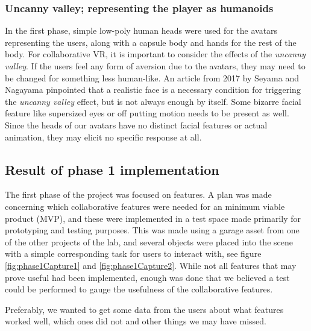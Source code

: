\subsubsection{Uncanny valley; representing the player as humanoids}
In the first phase, simple low-poly human heads were used for the avatars representing the users, along with a capsule body and hands for the rest of the body. For collaborative VR, it is important to consider the effects of the \textit{uncanny valley}\cite{mori2012uncanny}. If the users feel any form of aversion due to the avatars, they may need to be changed for something less human-like. An article from 2017 by Seyama and Nagayama \cite{seyama2007uncanny} pinpointed that a realistic face is a necessary condition for triggering the \textit{uncanny valley} effect, but is not always enough by itself. Some bizarre facial feature like supersized eyes or off putting motion needs to be present as well. Since the heads of our avatars have no distinct facial features or actual animation, they may elicit no specific response at all.

\subsection{Result of phase 1 implementation}
The first phase of the project was focused on features. A plan was made concerning which collaborative features were needed for an minimum viable product (MVP), and these were implemented in a test space made primarily for prototyping and testing purposes. This was made using a garage asset from one of the other projects of the lab, and several objects were placed into the scene with a simple corresponding task for users to interact with, see figure \ref{fig:phase1Capture1} and \ref{fig:phase1Capture2}. While not all features that may prove useful had been implemented, enough was done that we believed a test could be performed to gauge the usefulness of the collaborative features. 

Preferably, we wanted to get some data from the users about what features worked well, which ones did not and other things we may have missed.


